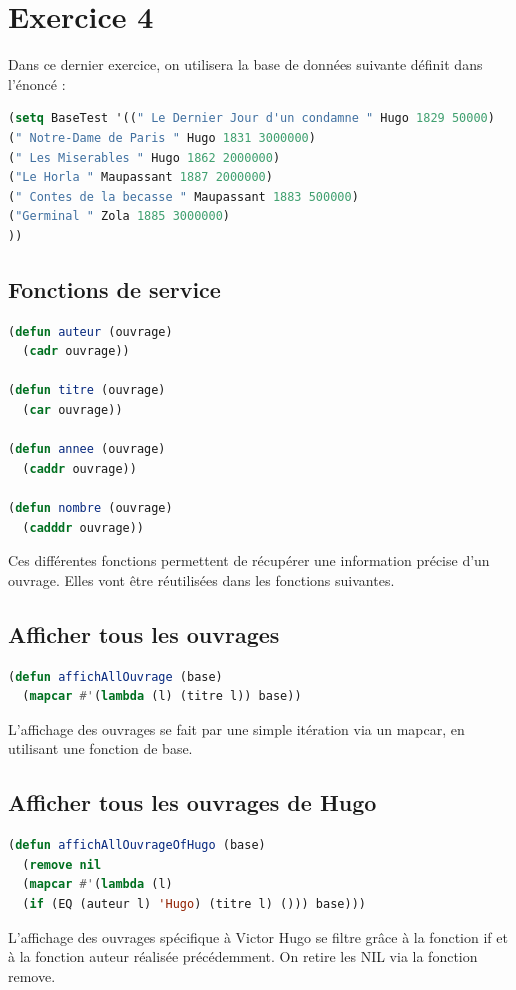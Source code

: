 \documentclass[a4paper,10pt]{report}
\begin{document}
	  
	  \chapter{Exercice 4} 
	  
	  Dans ce dernier exercice, on utilisera la base de données suivante définit dans l’énoncé :
	  \begin{lstlisting}[language=Lisp]
(setq BaseTest '((" Le Dernier Jour d'un condamne " Hugo 1829 50000)
(" Notre-Dame de Paris " Hugo 1831 3000000)
(" Les Miserables " Hugo 1862 2000000)
("Le Horla " Maupassant 1887 2000000)
(" Contes de la becasse " Maupassant 1883 500000)
("Germinal " Zola 1885 3000000)
))
	  \end{lstlisting}
	  
	  \section{Fonctions de service}
	  
	  \begin{lstlisting}[language=Lisp]
(defun auteur (ouvrage)
  (cadr ouvrage))

(defun titre (ouvrage)
  (car ouvrage))

(defun annee (ouvrage)
  (caddr ouvrage))

(defun nombre (ouvrage)
  (cadddr ouvrage))
	  \end{lstlisting}
	  
	  Ces différentes fonctions permettent de récupérer une information précise d’un ouvrage. Elles vont être réutilisées dans les fonctions suivantes.
	  \newpage
\section{Afficher tous les ouvrages}	  
\begin{lstlisting}[language=Lisp]	  
(defun affichAllOuvrage (base)
  (mapcar #'(lambda (l) (titre l)) base))
\end{lstlisting}
L’affichage des ouvrages se fait par une simple itération via un mapcar, en utilisant une fonction de base.
\section{Afficher tous les ouvrages de Hugo}	  
\begin{lstlisting}[language=Lisp]
(defun affichAllOuvrageOfHugo (base)
  (remove nil 
  (mapcar #'(lambda (l) 
  (if (EQ (auteur l) 'Hugo) (titre l) ())) base)))
\end{lstlisting}
L’affichage des ouvrages spécifique à Victor Hugo se filtre grâce à la fonction if et à la fonction auteur réalisée précédemment. On retire les NIL via la fonction remove.
\end{document}
